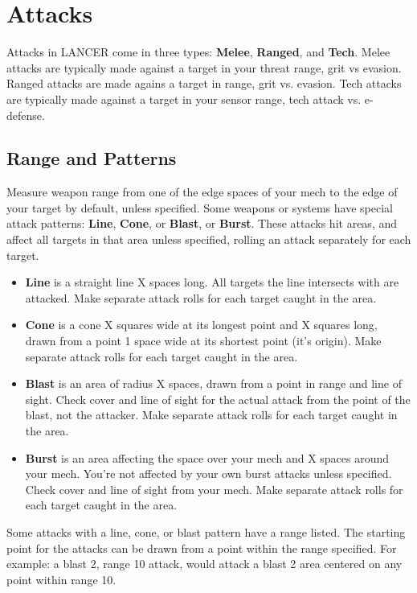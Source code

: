 \section{Attacks}
Attacks in LANCER come in three types: \textbf{Melee}, \textbf{Ranged}, and \textbf{Tech}. Melee attacks are typically made against a target in your threat range, grit vs evasion. Ranged attacks are made agains a target in range, grit vs. evasion. Tech attacks are typically made against a target in your sensor range, tech attack vs. e-defense.

\subsection{Range and Patterns}
Measure weapon range from one of the edge spaces of your mech to the edge of your target by default, unless specified.
Some weapons or systems have special attack patterns: \textbf{Line}, \textbf{Cone}, or \textbf{Blast}, or \textbf{Burst}. These attacks hit areas, and affect all targets in that area unless specified, rolling an attack separately for each target.
\begin{itemize}
\item \textbf{Line} is a straight line X spaces long. All targets the line intersects with are attacked. Make separate attack rolls for each target caught in the area.
\item \textbf{Cone} is a cone X squares wide at its longest point and X squares long, drawn from a point 1 space wide at its shortest point (it’s origin). Make separate attack rolls for each target caught in the area.
\item \textbf{Blast} is an area of radius X spaces, drawn from a point in range and line of sight. Check cover and line of sight for the actual attack from the point of the blast, not the attacker. Make separate attack rolls for each target caught in the area.
\item \textbf{Burst} is an area affecting the space over your mech and X spaces around your mech. You’re not affected by your own burst attacks unless specified. Check cover and line of sight from your mech. Make separate attack rolls for each target caught in the area.
\end{itemize}

Some attacks with a line, cone, or blast pattern have a range listed. The starting point for the attacks can be drawn from a point within the range specified. For example: a blast 2, range 10 attack, would attack a blast 2 area centered on any point within range 10.

